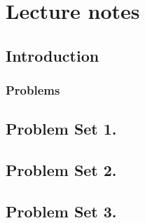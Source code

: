 %
%
\part{Lecture notes}
   \chapter{Introduction}
      
   
   
   
   
   
   
   
   
   
   
   
   
   
   
   
   
   \section{Problems}
      
      

   \chapter{Problem Set 1.}

      
      
      
      
      

   \chapter{Problem Set 2.}

      
      
      
      

   \chapter{Problem Set 3.}

